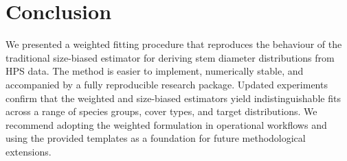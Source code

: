 \section{Conclusion}

We presented a weighted fitting procedure that reproduces the behaviour of the
traditional size-biased estimator for deriving stem diameter distributions from
HPS data. The method is easier to implement, numerically stable, and accompanied
by a fully reproducible research package. Updated experiments confirm that the
weighted and size-biased estimators yield indistinguishable fits across a range
of species groups, cover types, and target distributions. We recommend adopting
the weighted formulation in operational workflows and using the provided
templates as a foundation for future methodological extensions.

